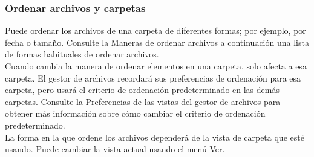 \subsubsection{Ordenar archivos y carpetas}
Puede ordenar los archivos de una carpeta de diferentes formas; por ejemplo, por fecha o tamaño. Consulte la Maneras de ordenar archivos a continuación una lista de formas habituales de ordenar archivos.\\
Cuando cambia la manera de ordenar elementos en una carpeta, solo afecta a esa carpeta. El gestor de archivos recordará sus preferencias de ordenación para esa carpeta, pero usará el criterio de ordenación predeterminado en las demás carpetas. Consulte la Preferencias de las vistas del gestor de archivos para obtener más información sobre cómo cambiar el criterio de ordenación predeterminado.\\
La forma en la que ordene los archivos dependerá de la vista de carpeta que esté usando. Puede cambiar la vista actual usando el menú Ver.
